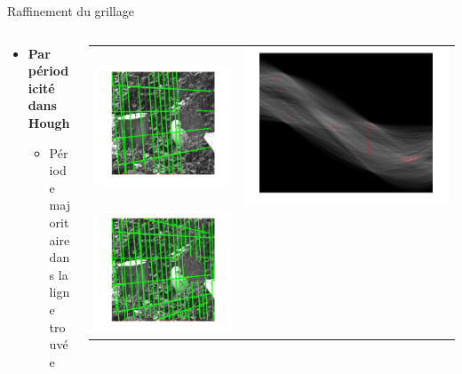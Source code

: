 \documentclass[11pt]{beamer}
\begin{document}
\begin{frame}{Raffinement du grillage}
	\begin{columns}
		\begin{column}{5cm}
		\begin{itemize}
			\item\textbf{Par périodicité dans Hough}
			\begin{itemize}
				\item Période majoritaire dans la ligne trouvée
			\end{itemize}
		\end{itemize}
		\end{column}
		\begin{column}{5cm}
	\begin{tabular}{cc}
		\includegraphics[width = 0.5 \columnwidth]{fig/grillagesansraf.png}
		& \includegraphics[width = 0.5 \columnwidth]{fig/houghsansraf.png} \\
		\includegraphics[width = 0.5 \columnwidth]{fig/grillageavecraf.png}

\end{tabular}
\end{column}
\end{columns}
\end{frame}
\end{document}
